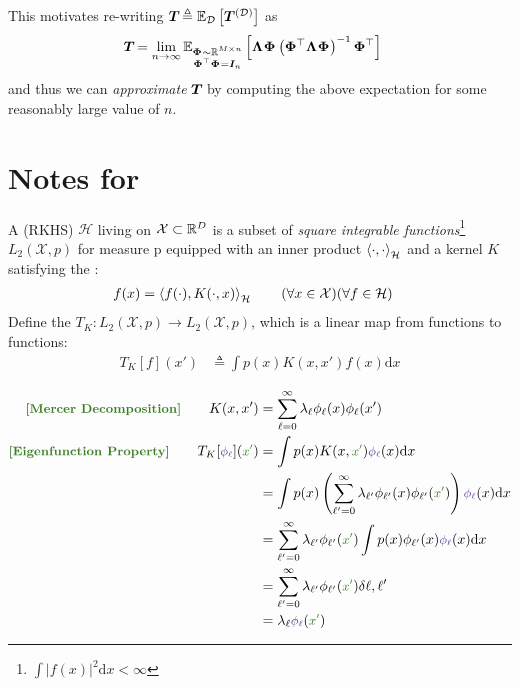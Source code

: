 \documentclass{article}
\newcommand\mc{\mathcal}
\begin{document}
\begin{appendices}
This motivates re-writing $\matr T \triangleq \E[\mc D]{\matr{T}^{(\mc D)}}$ as 
\begin{align}
	\matr T 
	&= \lim_{n \to \infty} \E[\substack{\matr\Phi \sim \R^{M \times n} \\ \matr{\Phi}^\top \matr{\Phi} = \matr[n]{I}  }]{ \matr\Lambda \matr\Phi \lr{  \matr{\Phi}^\top \matr\Lambda \matr\Phi  }^{-1} \matr{\Phi}^\top   }
\end{align}
and thus we can \textit{approximate} $\matr T$ by computing the above expectation for some reasonably large value of $n$. 
 

\clearpage 
\section{Notes for \cite{canatar2021}}\label{sec:rkhs}

A  (RKHS) $\mc H$ living on $\mc X \subset \R^D$ is a subset of \textit{square integrable functions}\footnote{$\int |f(x)|^2 \mathrm{d}x < \infty$}$L_2(\mc X, p)$ for measure p equipped with an inner product $\innerprod{\cdot}{\cdot}_{\mc H}$ and a kernel $K$ satisfying the :
\begin{align}
	f(x) &= 
	\innerprod{f(\cdot)}{K(\cdot, x)}_{\mc H}
	\qquad 	(\forall x \in \mc X) (\forall f \in \mc H) 
\end{align}
Define the  $T_K : L_2(\mc X, p) \to L_2(\mc X, p)$, which is a linear map from functions to functions:
\begin{align}
	T_K[f](x')
		&\triangleq \int p(x) K(x, x') f(x) \mathrm{d}x 
\end{align}
	
\begin{align}
	\mtgreen{[Mercer Decomposition]}\qquad
		K(x, x') 
			&= \sum_{\ell = 0}^{\infty} \lambda_{\ell} \phi_{\ell}(x) \phi_{\ell}(x') \\
	\mtgreen{[Eigenfunction Property]}\qquad
		T_K[\mpurple{\phi_\ell}](\mgreen{x'})
			&= \int p(x) K(x,\mgreen{x'})\mpurple{\phi_\ell}(x) \mathrm{d} x \\
			&= \int p(x) \lr{ \sum_{\ell' = 0}^{\infty} \lambda_{\ell'} \phi_{\ell'}(x) \phi_{\ell'}(\mgreen{x'}) }\mpurple{\phi_\ell}(x) \mathrm{d} x \\ 
			&=  \sum_{\ell' = 0}^{\infty} \lambda_{\ell'} \phi_{\ell'}(\mgreen{x'})  \int p(x) \phi_{\ell'}(x) \mpurple{\phi_\ell}(x) \mathrm{d} x \\ 
			&= \sum_{\ell' = 0}^{\infty} \lambda_{\ell'} \phi_{\ell'}(\mgreen{x'}) \delta{\ell, \ell'} \\
			&= \lambda_{\ell}  \mpurple{\phi_{\ell}}(\mgreen{x'})
\end{align}


\end{appendices}
\end{document}

